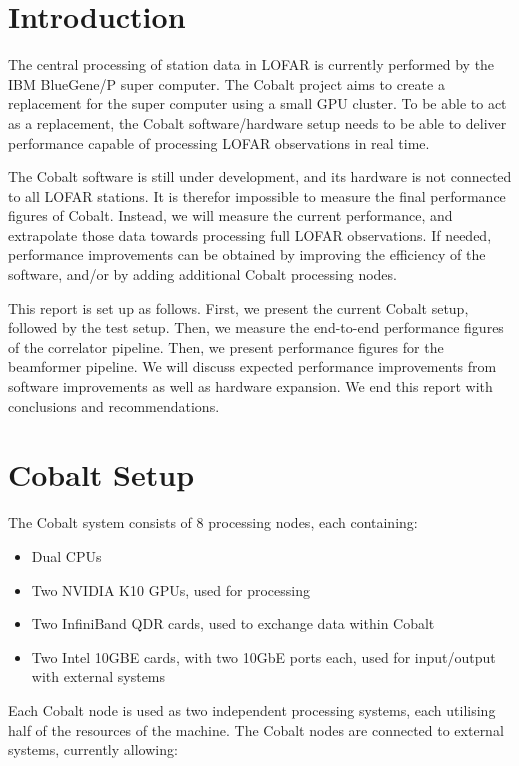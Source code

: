 \documentclass{report}
\begin{document}
\section{Introduction}
The central processing of station data in LOFAR is currently performed by the IBM BlueGene/P super computer. The Cobalt project aims to create a replacement for the super computer using a small GPU cluster. To be able to act as a replacement, the Cobalt software/hardware setup needs to be able to deliver performance capable of processing LOFAR observations in real time.

The Cobalt software is still under development, and its hardware is not connected to all LOFAR stations. It is therefor impossible to measure the final performance figures of Cobalt. Instead, we will measure the current performance, and extrapolate those data towards processing full LOFAR observations. If needed, performance improvements can be obtained by improving the efficiency of the software, and/or by adding additional Cobalt processing nodes.

This report is set up as follows. First, we present the current Cobalt setup, followed by the test setup. Then, we measure the end-to-end performance figures of the correlator pipeline. Then, we present performance figures for the beamformer pipeline. We will discuss expected performance improvements from software improvements as well as hardware expansion. We end this report with conclusions and recommendations.

\section{Cobalt Setup}

The Cobalt system consists of 8 processing nodes, each containing:

\begin{itemize}
\item Dual CPUs
\item Two NVIDIA K10 GPUs, used for processing
\item Two InfiniBand QDR cards, used to exchange data within Cobalt
\item Two Intel 10GBE cards, with two 10GbE ports each, used for input/output with external systems
\end{itemize}

Each Cobalt node is used as two independent processing systems, each utilising half of the resources of the machine. The Cobalt nodes are connected to external systems, currently allowing:
\end{document}
